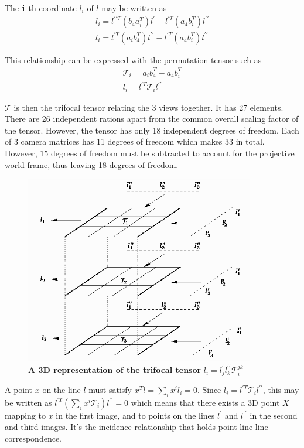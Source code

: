 The \texttt{i}-th coordinate $l_i$ of $l$ may be written as
\begin{gather*}
  l_i = l^{\prime \prime T} (b_{4}a^{T}_{i}) l^{\prime} - l^{\prime T}(a_{4}b^{T}_{i}) l^{\prime \prime}\\
  l_i = l^{\prime T} (a_{i}b^{T}_{4}) l^{\prime \prime} - l^{\prime T}(a_{4}b^{T}_{i}) l^{\prime \prime}
\end{gather*}

This relationship can be expressed with the permutation tensor such as
\begin{gather*}
  \mathcal{T}_{i} = a_{i}b^{T}_{4} - a_{4}b^{T}_{i}\\
  l_i = l^{\prime T} \mathcal{T}_{i} l^{\prime \prime}
\end{gather*}

$\mathcal{T}$ is then the trifocal tensor relating the 3 views together. It has 27 elements. There are 26 independent rations apart from the common overall scaling factor of the tensor. However, the tensor has only 18 independent degrees of freedom. Each of 3 camera matrices has 11 degrees of freedom which makes $33$ in total. However, $15$ degrees of freedom must be subtracted to account for the projective world frame, thus leaving 18 degrees of freedom.

\begin{figure}[ht!]
  \centering
  \includegraphics[width=100mm]{figures/trifocaltensor.png}
  \caption{\textbf{A 3D representation of the trifocal tensor}  $l_{i} = l_{j}^{\prime} l_{k}^{\prime \prime} \mathcal{T}_{i}^{jk}$ }
  \label{fig:trifocaltensor}
\end{figure}

A point $x$ on the line $l$ must satisfy $x^{T}l = \sum_{i} x^{i}l_{i} = 0$. Since $l_i = l^{\prime T} \mathcal{T}_{i} l^{\prime \prime}$, this may be written as
$
l^{\prime T}(\sum_{i} x^{i}\mathcal{T}_{i}) l^{\prime \prime} = 0
$
which means that there exists a 3D point $X$ mapping to $x$ in the first image, and to points on the lines $l^{\prime}$ and $l^{\prime \prime}$ in the second and third images. It's the incidence relationship that holds point-line-line correspondence.

